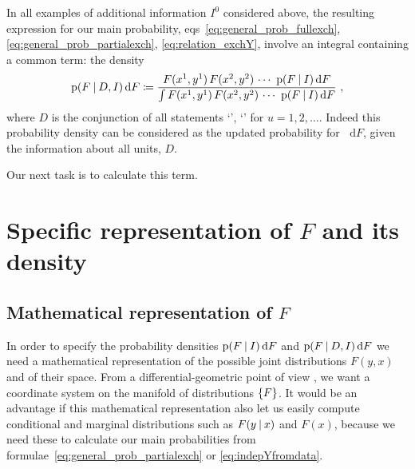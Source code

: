 \documentclass[a4paper,12pt,%
onecolumn,oneside,article,%
british%
]{memoir}
\newcommand*{\di}{\mathop{}\!\mathrm{d}}%
\newcommand*{\defd}{\coloneqq}
\DeclarePairedDelimiter\set{\{}{\}} %
\newcommand*{\p}{\mathrm{p}}%
\renewcommand*{\|}[1][]{\nonscript\:#1\vert\nonscript\:\mathopen{}}
\newcommand*{\mo}[1][=]{\mathclose{}\mathord{\nonscript\mkern0.5mu#1\nonscript\mkern0.5mu}\mathopen{}}
\newcommand*{\eqns}{eqs}%
\newcommand*{\ptext}[1]{\enquote*{\text{\small #1}}}%
\begin{document}
In all examples of additional information $I^{0}$ considered above, the resulting expression for our main probability, \eqns~\eqref{eq:general_prob_fullexch}, \eqref{eq:general_prob_partialexch}, \eqref{eq:relation_exchY}, involve an integral containing a common term: the density
\begin{equation}
  \label{eq:common_density}
  \p(F  \|D,I) \di F \defd
    \frac{
    F(x^{1},y^{1})\,F(x^{2},y^{2})\,\dotsm\  \p(F \| I) \di F
  }{
   \int F(x^{1},y^{1})\,F(x^{2},y^{2})\,\dotsm\  \p(F  \|I) \di F
  } \ ,
\end{equation}
where $D$ is the conjunction of all statements \ptext{$Y^{u}\mo y^{u}$}, \ptext{$X^{u}\mo x^{u}$} for $u=1,2,\dotsc$. Indeed this probability density can be considered as the updated probability for $\di F$, given the information about all units, $D$.

Our next task is to calculate this term.


\section{Specific representation of $F$ and its density}
\label{cha:repres_F}

\subsection{Mathematical representation of $F$}
\label{sec:repr_F_convexsum}


In order to specify the probability densities $\p(F  \| I) \di F$ and $\p(F  \| D, I) \di F$ we need a mathematical representation of the possible joint distributions $F(y,x)$ and of their space. From a differential-geometric point of view \autocites[III.A, VII.A]{choquetbruhatetal1977_r1996}, we want a coordinate system on the manifold of distributions $\set{F}$. It would be an advantage if this mathematical representation also let us easily compute conditional and marginal distributions such as $F(y\| x)$ and $F(x)$, because we need these to calculate our main probabilities from formulae~\eqref{eq:general_prob_partialexch} or \eqref{eq:indepYfromdata}.
\end{document}
